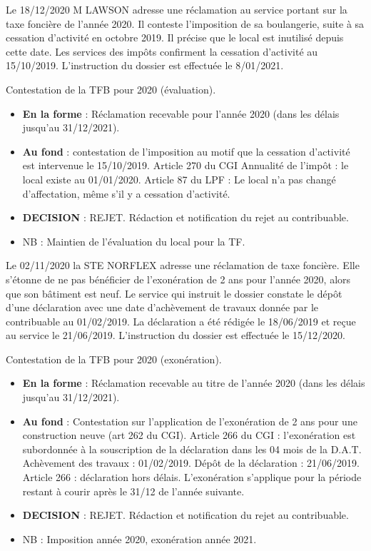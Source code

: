 \documentclass[a4paper, 12pt]{exam}
\begin{document}
\begin{questions}
	\question Le 18/12/2020 M LAWSON adresse une réclamation au service portant sur la taxe foncière de l'année 2020. Il conteste l'imposition de sa boulangerie, suite à sa cessation d'activité en octobre 2019. Il précise que le local est inutilisé depuis cette date. Les services des impôts confirment la cessation d'activité au 15/10/2019. L'instruction du dossier est effectuée le 8/01/2021.
	\begin{solution}
		Contestation de la TFB pour 2020 (évaluation).
		\begin{itemize}
			\item \textbf{En la forme} : Réclamation recevable pour l'année 2020 (dans les délais jusqu'au 31/12/2021).
			\item \textbf{Au fond} : contestation de l'imposition au motif que la cessation d'activité est intervenue le 15/10/2019. Article 270 du CGI Annualité de l'impôt : le local existe au 01/01/2020. Article 87 du LPF : Le local n'a pas changé d'affectation, même s'il y a cessation d'activité.
			\item \textbf{DECISION} : REJET. Rédaction et notification du rejet au contribuable.
			\item NB : Maintien de l'évaluation du local pour la TF.
		\end{itemize}
	\end{solution}
	
	\question Le 02/11/2020 la STE NORFLEX adresse une réclamation de taxe foncière. Elle s'étonne de ne pas bénéficier de l'exonération de 2 ans  pour l'année 2020, alors que son bâtiment est neuf. Le service qui instruit le dossier constate le dépôt d'une déclaration avec une date d'achèvement de travaux donnée par le contribuable au 01/02/2019. La déclaration a été rédigée le 18/06/2019 et reçue au service le 21/06/2019. L'instruction du dossier est effectuée le 15/12/2020.
	\begin{solution}
		Contestation de la TFB pour 2020 (exonération).
		\begin{itemize}
			\item \textbf{En la forme} : Réclamation recevable au titre de l'année 2020 (dans les délais jusqu'au 31/12/2021).
			\item \textbf{Au fond} : Contestation sur l'application de l'exonération de 2 ans  pour une construction neuve (art 262 du CGI). Article 266 du CGI : l'exonération est subordonnée à la souscription de la déclaration dans les 04 mois de la D.A.T. Achèvement des travaux : 01/02/2019. Dépôt de la déclaration : 21/06/2019. Article 266 : déclaration hors délais. L'exonération s'applique pour la période restant à courir après le 31/12 de l'année suivante.
			\item \textbf{DECISION} : REJET. Rédaction et notification du rejet au contribuable.
			\item NB : Imposition année 2020, exonération année 2021.
		\end{itemize}
	\end{solution}
	

\end{questions}
\end{document}

